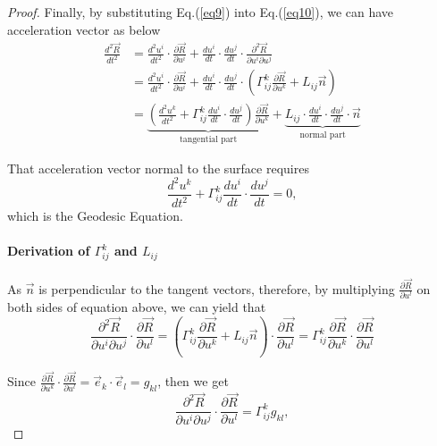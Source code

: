 \documentclass[a4paper]{article}
\theoremstyle{definition}
\theoremstyle{plain}
\begin{document}
\begin{proof}
Finally, by substituting Eq.(\ref{eq9}) into Eq.(\ref{eq10}), we can have acceleration vector as below
\begin{align*}
    \frac{d^2\vec{R}}{dt^2}&=\frac{d^2 u^i}{d t^2}\cdot\frac{\partial \vec{R}}{\partial u^i}+\frac{du^i}{dt}\cdot\frac{du^j}{dt}\cdot\frac{\partial^2\vec{R}}{\partial u^i\partial u^j}\\
    &=\frac{d^2 u^i}{d t^2}\cdot\frac{\partial \vec{R}}{\partial u^i}+\frac{du^i}{dt}\cdot\frac{du^j}{dt}\cdot\left(\Gamma_{ij}^k\frac{\partial \vec{R}}{\partial u^k}+L_{ij}\vec{n}\right)\\
    &=\underbrace{\left(\frac{d^2u^k}{dt^2}+\Gamma_{ij}^k\frac{du^i}{dt}\cdot\frac{du^j}{dt}\right)\frac{\partial\vec{R}}{\partial u^k}}_{\text{tangential part}}+\underbrace{L_{ij}\cdot\frac{du^i}{dt}\cdot\frac{du^j}{dt}\cdot\vec{n}}_{\text{normal part}}
\end{align*}

That acceleration vector normal to the surface requires
\begin{equation*}
    \frac{d^2u^k}{dt^2}+\Gamma_{ij}^k\frac{du^i}{dt}\cdot\frac{du^j}{dt}=0,
\end{equation*}
which is the Geodesic Equation.

\paragraph{Derivation of $\Gamma_{ij}^k$ and $L_{ij}$}
As $\vec{n}$ is perpendicular to the tangent vectors, therefore, by multiplying $\frac{\partial\vec{R}}{\partial u^l}$ on both sides of equation above, we can yield that
\begin{equation}
    \frac{\partial^2\vec{R}}{\partial u^i\partial u^j}\cdot\frac{\partial\vec{R}}{\partial u^l}=\left(\Gamma_{ij}^k\frac{\partial \vec{R}}{\partial u^k}+L_{ij}\vec{n}\right)\cdot\frac{\partial\vec{R}}{\partial u^l}=\Gamma_{ij}^k\frac{\partial \vec{R}}{\partial u^k}\cdot\frac{\partial\vec{R}}{\partial u^l}\label{eq8}
\end{equation}

Since $\frac{\partial \vec{R}}{\partial u^k}\cdot\frac{\partial\vec{R}}{\partial u^l}=\vec{e}_k\cdot\vec{e}_l=g_{kl}$, then we get
\begin{equation*}
    \frac{\partial^2\vec{R}}{\partial u^i\partial u^j}\cdot\frac{\partial\vec{R}}{\partial u^l}=\Gamma_{ij}^kg_{kl},
\end{equation*}


\end{proof}
\end{document}
